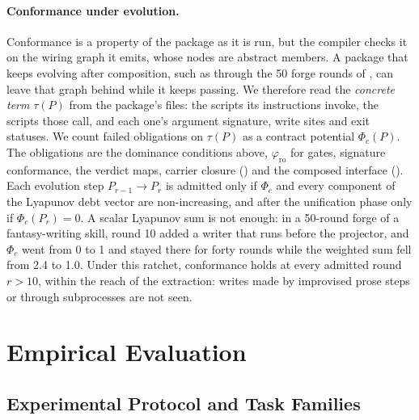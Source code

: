 \documentclass[11pt]{article}
\theoremstyle{definition}
\theoremstyle{plain}
\begin{document}
\paragraph{Conformance under evolution.} Conformance is a property of the package as it is run, but the compiler checks it on the wiring graph it emits, whose nodes are abstract members. A package that keeps evolving after composition, such as through the 50 forge rounds of , can leave that graph behind while it keeps passing. We therefore read the \emph{concrete term} $\tau(P)$ from the package's files: the scripts its instructions invoke, the scripts those call, and each one's argument signature, write sites and exit statuses. We count failed obligations on $\tau(P)$ as a contract potential $\Phi_c(P)$. The obligations are the dominance conditions above, $\varphi_{\mathrm{ro}}$ for gates, signature conformance, the verdict maps, carrier closure () and the composed interface (). Each evolution step $P_{r-1} \to P_r$ is admitted only if $\Phi_c$ and every component of the Lyapunov debt vector are non-increasing, and after the unification phase only if $\Phi_c(P_r) = 0$. A scalar Lyapunov sum is not enough: in a 50-round forge of a fantasy-writing skill, round 10 added a writer that runs before the projector, and $\Phi_c$ went from 0 to 1 and stayed there for forty rounds while the weighted sum fell from 2.4 to 1.0. Under this ratchet, conformance holds at every admitted round $r > 10$, within the reach of the extraction: writes made by improvised prose steps or through subprocesses are not seen.

\section{Empirical Evaluation}
\label{sec:eval}

\subsection{Experimental Protocol and Task Families}
\label{subsec:setup}
\end{document}
